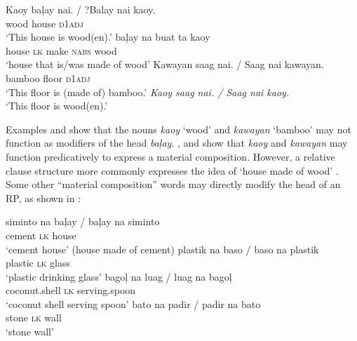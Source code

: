 \ea 
\label{bkm:Ref422580186}
    \ex \label{bkm:Ref422580186-b}
        \gll Kaoy  baļay  nai. / ?Balay nai kaoy. \\
        wood  house   \textsc{d}1\textsc{adj} \\
        \glt ‘This house is wood(en).’
    \ex \label{bkm:Ref422580186-c}
        \gll baļay  na  buat  ta  kaoy \\
        house  \textsc{lk}  make  \textsc{nabs}  wood \\
        \glt ‘house that is/was made of wood’
    \z
\z
\ea
\label{bkm:Ref422580189}
    \ex
    \label{bkm:Ref422580189-b}
        \gll Kawayan  saag  nai. / Saag nai kawayan. \\
            bamboo  floor  \textsc{d}1\textsc{adj} \\
        \glt  ‘This floor is (made of) bamboo.’
    \ex 
    \label{bkm:Ref422580189-c}
        \textit{Kaoy saag nai. / Saag nai kaoy.} \\
        ‘This floor is wood(en).’
    \z
\z

Examples  and  show that the nouns \textit{kaoy} ‘wood’ and \textit{kawayan} ‘bamboo’ may not function as modifiers of the head \textit{baļay}. ,  and  show that \textit{kaoy} and \textit{kawayan} may function predicatively to express a material composition. However, a relative clause structure more commonly expresses the idea of ‘house made of wood’ . Some other “material composition” words may directly modify the head of an RP, as shown in :

\ea
\label{bkm:Ref422580415}
    \ea   
        \gll siminto  na  baļay / baļay na siminto \\
        cement  \textsc{lk}  house \\
        \glt ‘cement house’ (house made of cement)
    \ex
        \gll plastik  na  baso / baso na plastik \\
          plastic  \textsc{lk}  glass \\
        \glt ‘plastic drinking glass’
    \ex
        \gll bagoļ  na  luag  / luag na bagoļ \\
          coconut.shell  \textsc{lk}  serving.spoon \\
        \glt ‘coconut shell serving spoon’
    \ex
        \gll bato  na  padir / padir na bato \\
        stone  \textsc{lk} wall \\
        \glt ‘stone wall’
    \z  
\z

